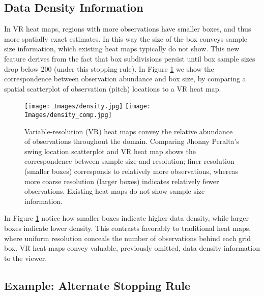 \subsection{Data Density Information}

In VR heat maps, regions with more observations have smaller boxes, and thus more spatially exact estimates. In this way the size of the box conveys sample size information, which existing heat maps typically do not show. This new feature derives from the fact that box subdivisions persist until box sample sizes drop below 200 (under this stopping rule). In Figure \ref{fig:density} we show the correspondence between observation abundance and box size, by comparing a spatial scatterplot of observation (pitch) locations to a VR heat map. 
        \begin{figure}[H]
      	\centering
      	\texttt{[image: Images/density.jpg]}
      	\texttt{[image: Images/density\_comp.jpg]} 
      	\caption{Variable-resolution (VR) heat maps convey the relative abundance of observations throughout the domain. Comparing Jhonny Peralta's swing location scatterplot and VR heat map shows the correspondence between sample size and resolution; finer resolution (smaller boxes) corresponds to relatively more observations, whereas more coarse resolution (larger boxes) indicates relatively fewer observations. Existing heat maps do not show sample size information.}
      	\label{fig:density}
      	\end{figure}
In Figure \ref{fig:density} notice how smaller boxes indicate higher data density, while larger boxes indicate lower density. This contrasts favorably to traditional heat maps, where uniform resolution conceals the number of observations behind each grid box. VR heat maps convey valuable, previously omitted, data density information to the viewer. 
      	
\subsection{Example: Alternate Stopping Rule} %
      	
